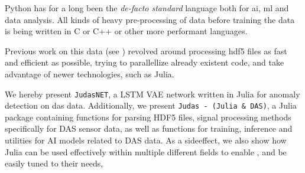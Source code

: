 Python has for a long been the \textit{de-facto standard} language both for \acrshort{ai}, \acrshort{ml} and data analysis. All kinds of heavy pre-processing of data before training the data is being written in C or C++ or other more performant languages.    




Previous work on this data (see \cite{projthesis}) revolved around processing \acrshort{hdf5} files as fast and efficient as possible, trying to parallellize already existent code, and take advantage of newer technologies, such as Julia.



We hereby present \texttt{JudasNET}, a LSTM VAE network written in Julia for anomaly detection on \acrshort{das} data. Additionally, we present \texttt{Judas - (Julia \& DAS)}, a Julia package containing functions for parsing HDF5 files, signal processing methods specifically for DAS sensor data, as well as functions for training, inference and utilities for AI models related to DAS data. As a sideeffect, we also show how Julia can be used effectively within multiple different fields to enable , and be easily tuned to their needs,